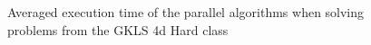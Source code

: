\documentclass{svproc}
\begin{document}
\begin{figure}[ht]
  \centering
  \caption{Averaged execution time of the parallel algorithms when solving problems from the GKLS 4d Hard class}
\end{figure}
\end{document}
